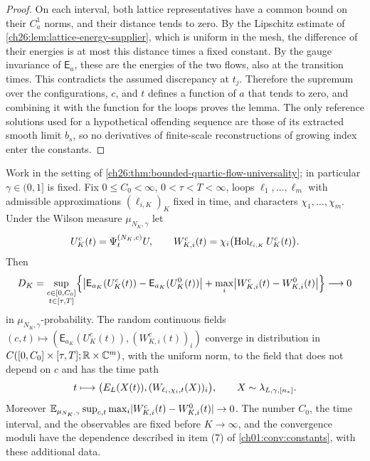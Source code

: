 \begin{proof}
On each interval, both lattice representatives have a common bound on their $C_a^1$ norms, and their distance tends to zero. By the Lipschitz estimate of \cref{ch26:lem:lattice-energy-supplier}, which is uniform in the mesh, the difference of their energies is at most this distance times a fixed constant. By the gauge invariance of $\mathsf E_a$, these are the energies of the two flows, also at the transition times. This contradicts the assumed discrepancy at $t_j$. Therefore the supremum over the configurations, $c$, and $t$ defines a function of $a$ that tends to zero, and combining it with the function for the loops proves the lemma. The only reference solutions used for a hypothetical offending sequence are those of its extracted smooth limit $b_s$, so no derivatives of finite-scale reconstructions of growing index enter the constants.
\end{proof}

\begin{theorem}\label{ch26:thm:bounded-quartic-observable-paths}
Work in the setting of \cref{ch26:thm:bounded-quartic-flow-universality}; in particular $\gamma\in(0,1]$ is fixed. Fix $0\le C_0<\infty$, $0<\tau<T<\infty$, loops $\ell_1,\dots,\ell_m$ with admissible approximations $(\ell_{i,K})_K$ fixed in time, and characters $\chi_1,\dots,\chi_m$. Under the Wilson measure $\mu_{N_K,\gamma}$ let
\[
 U^c_K(t)=\Psi^{(N_K,c)}_tU,\qquad W^c_{K,i}(t)=\chi_i\bigl(\operatorname{Hol}_{\ell_{i,K}}U^c_K(t)\bigr).
\]
Then
\begin{equation}\label{ch26:eq:alternative-energy-path-comparison}
 D_K=\sup_{\substack{c\in[0,C_0]\\t\in[\tau,T]}}\Bigl\{\bigl\lvert\mathsf E_{a_K}(U^c_K(t))-\mathsf E_{a_K}(U^0_K(t))\bigr\rvert+\max_i\bigl\lvert W^c_{K,i}(t)-W^0_{K,i}(t)\bigr\rvert\Bigr\}\longrightarrow0
\end{equation}
in $\mu_{N_K,\gamma}$-probability. The random continuous fields $(c,t)\mapsto(\mathsf E_{a_K}(U^c_K(t)),(W^c_{K,i}(t))_i)$ converge in distribution in $C([0,C_0]\times[\tau,T];\mathbb R\times\mathbb C^m)$, with the uniform norm, to the field that does not depend on $c$ and has the time path
\[
 t\longmapsto\bigl(E_L(X(t)),(W_{\ell_i,\chi_i,t}(X))_i\bigr),\qquad X\sim\lambda_{L,\gamma,[n_*]}.
\]
Moreover $\mathbb E_{\mu_{N_K,\gamma}}\sup_{c,t}\max_i\lvert W^c_{K,i}(t)-W^0_{K,i}(t)\rvert\to0$. The number $C_0$, the time interval, and the observables are fixed before $K\to\infty$, and the convergence moduli have the dependence described in item (7) of \cref{ch01:conv:constants}, with these additional data.
\end{theorem}

